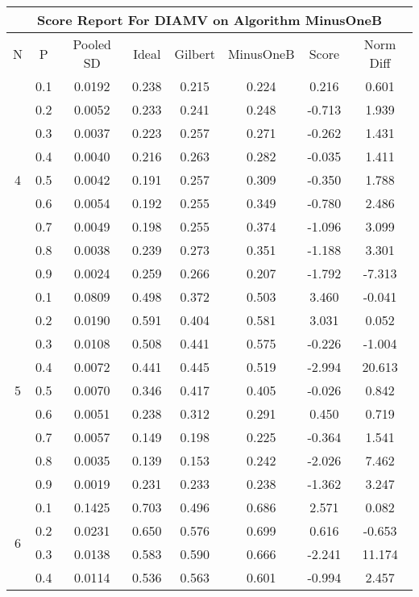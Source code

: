 \documentclass[11pt,a4paper]{report}
\begin{document}
\begin{longtable}{ | c | c || c | c | c | c | c | c | }
\hline
\multicolumn{8}{|c|}{ Score Report For DIAMV on Algorithm MinusOneB} \\
\hline
N & P & Pooled SD &  Ideal &  Gilbert & MinusOneB  & Score & Norm Diff \\
 \hline
 \hline
 \endhead
\multirow{9}{*}{4} & 0.1 & 0.0192 & 0.238 & 0.215 & 0.224 & 0.216 & 0.601 \\
 & 0.2 & 0.0052 & 0.233 & 0.241 & 0.248 & -0.713 & 1.939 \\
 & 0.3 & 0.0037 & 0.223 & 0.257 & 0.271 & -0.262 & 1.431 \\
 & 0.4 & 0.0040 & 0.216 & 0.263 & 0.282 & -0.035 & 1.411 \\
 & 0.5 & 0.0042 & 0.191 & 0.257 & 0.309 & -0.350 & 1.788 \\
 & 0.6 & 0.0054 & 0.192 & 0.255 & 0.349 & -0.780 & 2.486 \\
 & 0.7 & 0.0049 & 0.198 & 0.255 & 0.374 & -1.096 & 3.099 \\
 & 0.8 & 0.0038 & 0.239 & 0.273 & 0.351 & -1.188 & 3.301 \\
 & 0.9 & 0.0024 & 0.259 & 0.266 & 0.207 & -1.792 & -7.313 \\
 \hline
\multirow{9}{*}{5} & 0.1 & 0.0809 & 0.498 & 0.372 & 0.503 & 3.460 & -0.041 \\
 & 0.2 & 0.0190 & 0.591 & 0.404 & 0.581 & 3.031 & 0.052 \\
 & 0.3 & 0.0108 & 0.508 & 0.441 & 0.575 & -0.226 & -1.004 \\
 & 0.4 & 0.0072 & 0.441 & 0.445 & 0.519 & -2.994 & 20.613 \\
 & 0.5 & 0.0070 & 0.346 & 0.417 & 0.405 & -0.026 & 0.842 \\
 & 0.6 & 0.0051 & 0.238 & 0.312 & 0.291 & 0.450 & 0.719 \\
 & 0.7 & 0.0057 & 0.149 & 0.198 & 0.225 & -0.364 & 1.541 \\
 & 0.8 & 0.0035 & 0.139 & 0.153 & 0.242 & -2.026 & 7.462 \\
 & 0.9 & 0.0019 & 0.231 & 0.233 & 0.238 & -1.362 & 3.247 \\
 \hline
\multirow{9}{*}{6} & 0.1 & 0.1425 & 0.703 & 0.496 & 0.686 & 2.571 & 0.082 \\
 & 0.2 & 0.0231 & 0.650 & 0.576 & 0.699 & 0.616 & -0.653 \\
 & 0.3 & 0.0138 & 0.583 & 0.590 & 0.666 & -2.241 & 11.174 \\
 & 0.4 & 0.0114 & 0.536 & 0.563 & 0.601 & -0.994 & 2.457 \\

\end{longtable}
\end{document}
